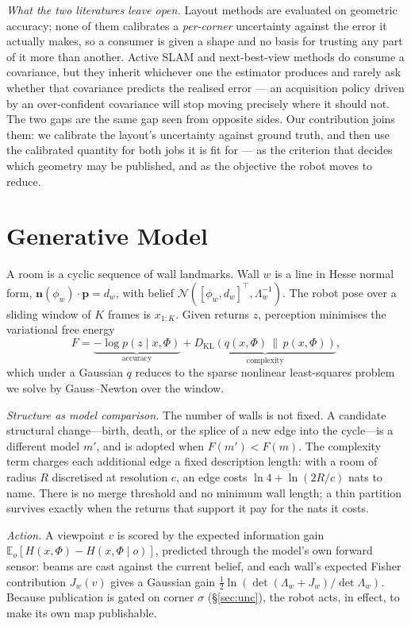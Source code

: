 \documentclass[conference,letterpaper,10pt]{IEEEtran}
\begin{document}
\emph{What the two literatures leave open.} Layout methods are evaluated on geometric
accuracy; none of them calibrates a \emph{per-corner} uncertainty against the error it actually makes,
so a consumer is given a shape and no basis for trusting any part of it more than another. Active
SLAM and next-best-view methods do consume a covariance, but they inherit whichever one the estimator
produces and rarely ask whether that covariance predicts the realised error --- an acquisition policy
driven by an over-confident covariance will stop moving precisely where it should not. The two gaps
are the same gap seen from opposite sides. Our contribution joins them: we calibrate the layout's
uncertainty against ground truth, and then use the calibrated quantity for both jobs it is fit for ---
as the criterion that decides which geometry may be published, and as the objective the robot moves to
reduce.

\section{Generative Model}

A room is a cyclic sequence of wall landmarks. Wall $w$ is a line in Hesse normal form,
$\mathbf{n}(\phi_w)\cdot\mathbf{p} = d_w$, with belief $\mathcal{N}\!\left([\phi_w, d_w]^\top,
\Lambda_w^{-1}\right)$. The robot pose over a sliding window of $K$ frames is $x_{1:K}$. Given
returns $z$, perception minimises the variational free energy
\begin{equation}
F = \underbrace{-\log p(z \mid x, \Phi)}_{\text{accuracy}} + \underbrace{D_{\mathrm{KL}}\!\left(q(x,\Phi)\,\|\,p(x,\Phi)\right)}_{\text{complexity}},
\end{equation}
which under a Gaussian $q$ reduces to the sparse nonlinear least-squares problem we solve by
Gauss--Newton over the window.

\emph{Structure as model comparison.} The number of walls is not fixed. A candidate structural
change---birth, death, or the splice of a new edge into the cycle---is a different model $m'$, and is
adopted when $F(m') < F(m)$. The complexity term charges each additional edge a fixed description
length: with a room of radius $R$ discretised at resolution $c$, an edge costs
$\ln 4 + \ln(2R/c)$ nats to name. There is no merge threshold and no minimum wall length; a thin
partition survives exactly when the returns that support it pay for the nats it costs.

\emph{Action.} A viewpoint $v$ is scored by the expected information gain
$\mathbb{E}_{o}\!\left[H(x,\Phi) - H(x,\Phi \mid o)\right]$, predicted through the model's own
forward sensor: beams are cast against the current belief, and each wall's expected Fisher
contribution $J_w(v)$ gives a Gaussian gain $\tfrac{1}{2}\ln\left(\det(\Lambda_w + J_w)/\det
\Lambda_w\right)$. Because publication is gated on corner $\sigma$ (\S\ref{sec:unc}), the robot
acts, in effect, to make its own map publishable.
\end{document}
